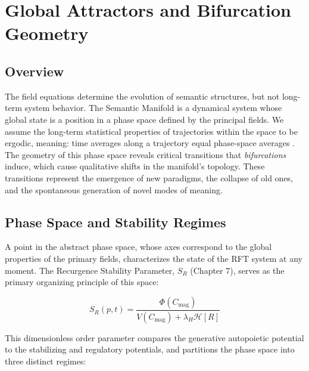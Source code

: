\chapter{Global Attractors and Bifurcation Geometry}
\label{11:global_attractors_and_bifurcation_geometry}


\section{Overview}
\label{11.1:overview}

The field equations determine the evolution of semantic structures, but not long-term system behavior. The Semantic Manifold is a dynamical system whose global state is a position in a phase space defined by the principal fields. We assume the long-term statistical properties of trajectories within the space to be ergodic, meaning: time averages along a trajectory equal phase-space averages \autocite{Birkhoff1931}. The geometry of this phase space reveals critical transitions that \textit{bifurcations} induce, which cause qualitative shifts in the manifold's topology. These transitions represent the emergence of new paradigms, the collapse of old ones, and the spontaneous generation of novel modes of meaning.


\section{Phase Space and Stability Regimes}
\label{11.2:phase_space_and_stability_regimes}

A point in the abstract phase space, whose axes correspond to the global properties of the primary fields, characterizes the state of the RFT system at any moment. The Recurgence Stability Parameter, \(S_R\) (Chapter 7), serves as the primary organizing principle of this space:

\begin{equation}
S_R(p,t) = \frac{\Phi(C_{\mathrm{mag}})}{V(C_{\mathrm{mag}}) + \lambda_H \mathcal{H}[R]}
\end{equation}

This dimensionless order parameter compares the generative autopoietic potential to the stabilizing and regulatory potentials, and partitions the phase space into three distinct regimes:

